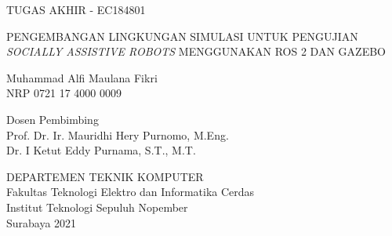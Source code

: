 TUGAS AKHIR - EC184801

\vspace{6ex}

\begin{large}
  PENGEMBANGAN LINGKUNGAN SIMULASI UNTUK PENGUJIAN \emph{SOCIALLY ASSISTIVE ROBOTS} MENGGUNAKAN ROS 2 DAN GAZEBO
\end{large}

\vspace{4ex}

Muhammad Alfi Maulana Fikri \\
NRP 0721 17 4000 0009

\vspace{2ex}

Dosen Pembimbing \\
Prof. Dr. Ir. Mauridhi Hery Purnomo, M.Eng. \\
Dr. I Ketut Eddy Purnama, S.T., M.T.

\vspace{6ex}

DEPARTEMEN TEKNIK KOMPUTER \\
Fakultas Teknologi Elektro dan Informatika Cerdas \\
Institut Teknologi Sepuluh Nopember \\
Surabaya 2021
